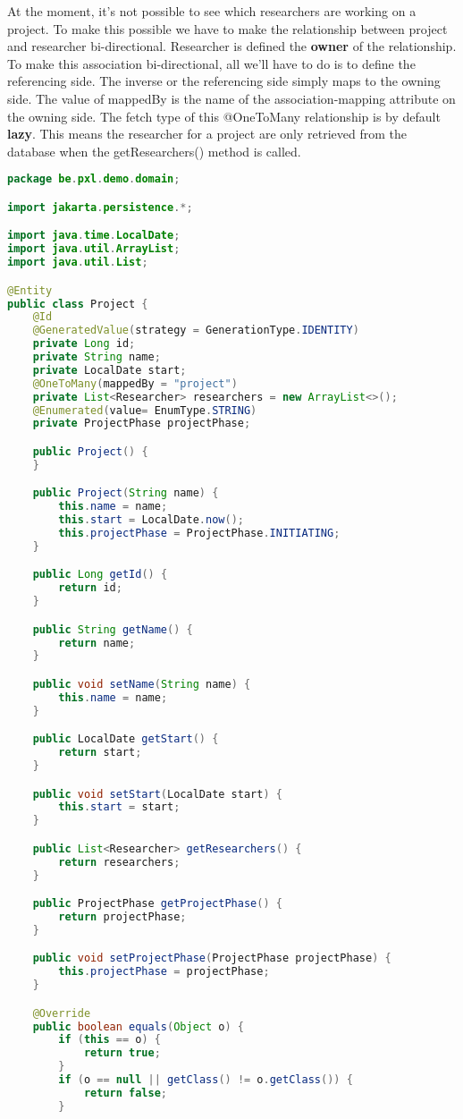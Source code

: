 At the moment, it's not possible to see which researchers are working on a project. To make this possible we have to make the relationship between project and researcher bi-directional.  Researcher is defined the \textbf{owner} of the relationship. To make this association bi-directional, all we'll have to do is to define the referencing side. The inverse or the referencing side simply maps to the owning side.  The value of mappedBy is the name of the association-mapping attribute on the owning side.  The fetch type of this @OneToMany relationship is by default \textbf{lazy}. This means the researcher for a project are only retrieved from the database when the getResearchers() method is called.

\begin{lstlisting}[frame=single, language=java]
package be.pxl.demo.domain;

import jakarta.persistence.*;

import java.time.LocalDate;
import java.util.ArrayList;
import java.util.List;

@Entity
public class Project {
	@Id
	@GeneratedValue(strategy = GenerationType.IDENTITY)
	private Long id;
	private String name;
	private LocalDate start;
	@OneToMany(mappedBy = "project")
	private List<Researcher> researchers = new ArrayList<>();
	@Enumerated(value= EnumType.STRING)
	private ProjectPhase projectPhase;

	public Project() {
	}

	public Project(String name) {
		this.name = name;
		this.start = LocalDate.now();
		this.projectPhase = ProjectPhase.INITIATING;
	}

	public Long getId() {
		return id;
	}

	public String getName() {
		return name;
	}

	public void setName(String name) {
		this.name = name;
	}

	public LocalDate getStart() {
		return start;
	}

	public void setStart(LocalDate start) {
		this.start = start;
	}

	public List<Researcher> getResearchers() {
		return researchers;
	}

	public ProjectPhase getProjectPhase() {
		return projectPhase;
	}

	public void setProjectPhase(ProjectPhase projectPhase) {
		this.projectPhase = projectPhase;
	}

	@Override
	public boolean equals(Object o) {
		if (this == o) {
			return true;
		}
		if (o == null || getClass() != o.getClass()) {
			return false;
		}


\end{lstlisting}

